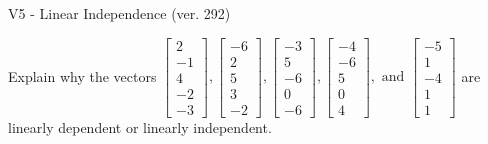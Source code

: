 \begin{exercise}
  \begin{exerciseTitle}V5 - Linear Independence (ver. 292)\end{exerciseTitle}
  \begin{exerciseStatement}
    Explain why the vectors \(\left[\begin{array}{r}
2 \\
-1 \\
4 \\
-2 \\
-3
\end{array}\right] , \left[\begin{array}{r}
-6 \\
2 \\
5 \\
3 \\
-2
\end{array}\right] , \left[\begin{array}{r}
-3 \\
5 \\
-6 \\
0 \\
-6
\end{array}\right] , \left[\begin{array}{r}
-4 \\
-6 \\
5 \\
0 \\
4
\end{array}\right] , \text{ and } \left[\begin{array}{r}
-5 \\
1 \\
-4 \\
1 \\
1
\end{array}\right]\) are linearly dependent or linearly independent.	



\end{exerciseStatement}
\end{exercise}
